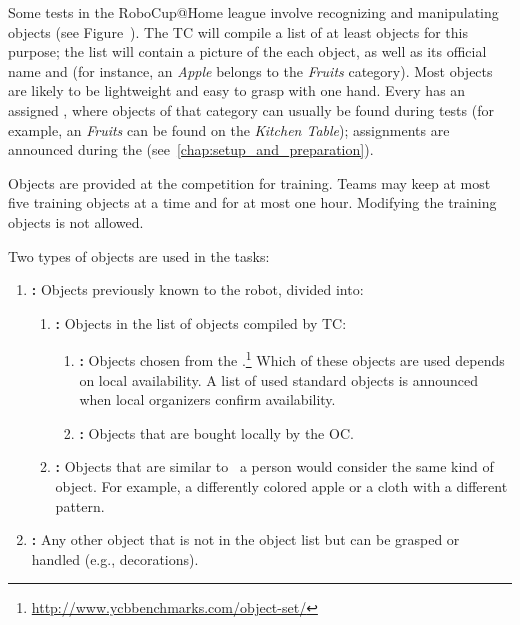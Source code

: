 Some tests in the RoboCup@Home league involve recognizing and manipulating objects (see Figure~).
The TC will compile a list of at least \NumObjects objects for this purpose; the list will contain a picture of the each object, as well as its official name and \ObjectCategory{} (for instance, an \textit{Apple} belongs to the \textit{Fruits} category).
Most objects are likely to be lightweight and easy to grasp with one hand.
Every \ObjectCategory{} has an assigned \PredefinedLocation, where objects of that category can usually be found during tests (for example, an \textit{Fruits} can be found on the \textit{Kitchen Table}); assignments are announced during the \SetupDays{} (see~\ref{chap:setup_and_preparation}).

Objects are provided at the competition for training.
Teams may keep at most five training objects at a time and for at most one hour.
Modifying the training objects is not allowed.

Two types of objects are used in the tasks:
\begin{enumerate}
	\item \textbf{\KnownObjects{}:} Objects previously known to the robot, divided into:
	\begin{enumerate}
		\item \textbf{\ListedObjects{}:} Objects in the list of objects compiled by TC:
		\begin{enumerate}
			\item \textbf{\StandardObjects{}:} Objects chosen from the \YCBData{}.\footnote{\url{http://www.ycbbenchmarks.com/object-set/}} Which of these objects are used depends on local availability. A list of used standard objects is announced when local organizers confirm availability.
			\item \textbf{\AdditionalObjects{}:} Objects that are bought locally by the OC.
		\end{enumerate}
		\item \textbf{\SimilarObjects{}:} Objects that are similar to \ListedObjects \ a person would consider the same kind of object. For example, a differently colored apple or a cloth with a different pattern.
	\end{enumerate}
	
	\item \textbf{\UnknownObjects{}:} Any other object that is not in the object list but can be grasped or handled (e.g., \Arena{} decorations).
\end{enumerate}

